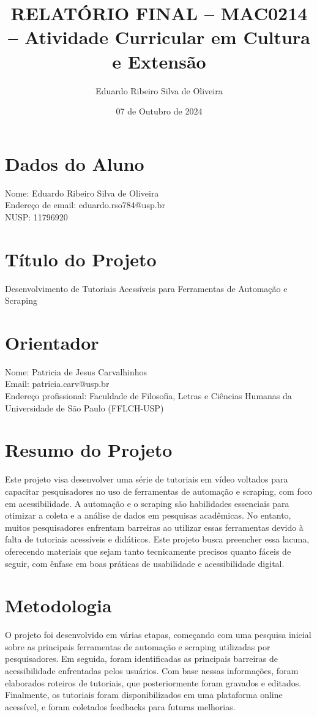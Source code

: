 \documentclass{article}
\title{RELATÓRIO FINAL – MAC0214 – Atividade Curricular em Cultura e Extensão}
\author{Eduardo Ribeiro Silva de Oliveira}
\date{07 de Outubro de 2024}
\begin{document}
\maketitle

\section*{Dados do Aluno}
Nome: Eduardo Ribeiro Silva de Oliveira\\
Endereço de email: eduardo.rso784@usp.br\\
NUSP: 11796920

\section*{Título do Projeto}
Desenvolvimento de Tutoriais Acessíveis para Ferramentas de Automação e Scraping

\section*{Orientador}
Nome: Patricia de Jesus Carvalhinhos\\
Email: patricia.carv@usp.br\\
Endereço profissional: Faculdade de Filosofia, Letras e Ciências Humanas da Universidade de São Paulo (FFLCH-USP)

\section*{Resumo do Projeto}
Este projeto visa desenvolver uma série de tutoriais em vídeo voltados para capacitar pesquisadores no uso de ferramentas de automação e scraping, com foco em acessibilidade. A automação e o scraping são habilidades essenciais para otimizar a coleta e a análise de dados em pesquisas acadêmicas. No entanto, muitos pesquisadores enfrentam barreiras ao utilizar essas ferramentas devido à falta de tutoriais acessíveis e didáticos. Este projeto busca preencher essa lacuna, oferecendo materiais que sejam tanto tecnicamente precisos quanto fáceis de seguir, com ênfase em boas práticas de usabilidade e acessibilidade digital.

\section*{Metodologia}
O projeto foi desenvolvido em várias etapas, começando com uma pesquisa inicial sobre as principais ferramentas de automação e scraping utilizadas por pesquisadores. Em seguida, foram identificadas as principais barreiras de acessibilidade enfrentadas pelos usuários. Com base nessas informações, foram elaborados roteiros de tutoriais, que posteriormente foram gravados e editados. Finalmente, os tutoriais foram disponibilizados em uma plataforma online acessível, e foram coletados feedbacks para futuras melhorias.
\end{document}
